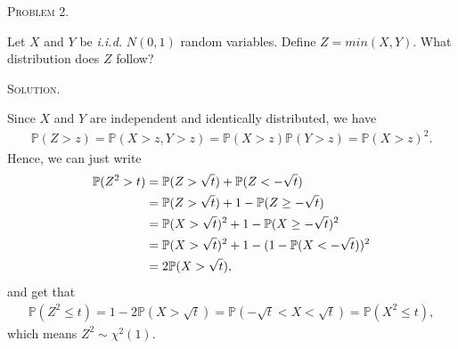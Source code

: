 \documentclass{article}
\begin{document}
\begin{CJK}{UTF8}{gbsn}
    \begin{shaded}
        \noindent\textsc{Problem 2.}\par
        Let $X$ and $Y$ be \textit{i.i.d.} $N(0,1)$ random variables. Define $Z=min(X, Y)$. What
        distribution does $Z$ follow?
    \end{shaded}
    \noindent\textsc{Solution.}\par
    Since $X$ and $Y$ are independent and identically distributed, we have
    \begin{align}
        \mathbb{P}(Z >z) = \mathbb{P}(X>z, Y>z) = \mathbb{P}(X>z)\mathbb{P}(Y>z) = \mathbb{P}(X>z)^2.
    \end{align}
    Hence, we can just write
    \begin{align}
        \mathbb{P}(Z^2 >t) & = \mathbb{P}(Z>\sqrt{t}) + \mathbb{P}(Z<-\sqrt{t})\notag            \\
                           & =\mathbb{P}(Z>\sqrt{t}) + 1 - \mathbb{P}(Z\geq-\sqrt{t})\notag      \\
                           & =\mathbb{P}(X>\sqrt{t})^2 + 1 - \mathbb{P}(X\geq-\sqrt{t})^2\notag  \\
                           & =\mathbb{P}(X>\sqrt{t})^2 + 1 - (1-\mathbb{P}(X<-\sqrt{t}))^2\notag \\
                           & =2\mathbb{P}(X>\sqrt{t}),
    \end{align}
    and get that
    \begin{align}
        \mathbb{P}(Z^2\leq t) = 1 - 2\mathbb{P}(X>\sqrt{t}) = \mathbb{P}(-\sqrt{t}<X<\sqrt{t}) = \mathbb{P}(X^2\leq t),
    \end{align}
    which means $Z^2 \sim \chi^2(1)$.




\end{CJK}
\end{document}
